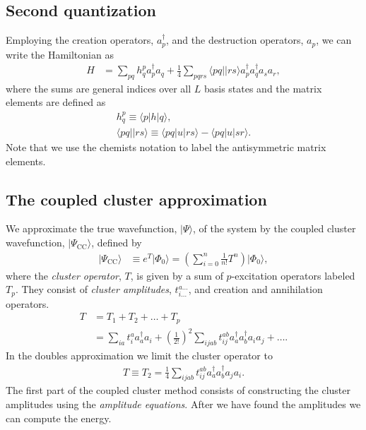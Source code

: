 \documentclass[
    a4paper, aps, twocolumn, floatfix, superscriptaddress,
    nofootinbib]{revtex4-1}
\newcommand{\1}{\mathds{1}}
\newcommand{\para}[1]{\left(#1\right)}
\newcommand{\bra}[1]{\langle #1\lvert}
\newcommand{\ket}[1]{\rvert #1\rangle}
\newcommand{\acr}[1]{a_{#1}^{\dagger}}
\newcommand{\ade}[1]{a_{#1}}
\begin{document}
    \subsection{Second quantization}
        Employing the creation operators, $\acr{p}$, and the destruction
        operators, $\ade{p}$, we can write the Hamiltonian as
        \begin{align}
            H
            &=
            \sum_{pq}h_{q}^{p}\acr{p}\ade{q}
            + \frac{1}{4}\sum_{pqrs}\bra{pq}\ket{rs}\acr{p}\acr{q}\ade{s}\ade{r},
        \end{align}
        where the sums are general indices over all $L$ basis states and the
        matrix elements are defined as
        \begin{gather}
            h^{p}_{q} \equiv \bra{p}h\ket{q}, \\
            \bra{pq}\ket{rs} \equiv \bra{pq}u\ket{rs} - \bra{pq}u\ket{sr}.
        \end{gather}
        Note that we use the chemists notation to label the antisymmetric matrix
        elements.

    \subsection{The coupled cluster approximation}
        We approximate the true wavefunction, $\ket{\Psi}$, of the system by the
        coupled cluster wavefunction, $\ket{\Psi_{\text{CC}}}$, defined by
        \begin{align}
            \ket{\Psi_{\text{CC}}}
            &\equiv e^{T}\ket{\Phi_0}
            = \para{
                \sum_{i = 0}^n
                \frac{1}{n!}T^n
            }\ket{\Phi_0},
        \end{align}
        where the \emph{cluster operator}, $T$, is given by a sum of
        $p$-excitation operators labeled $T_p$. They consist of \emph{cluster
        amplitudes}, $t_{i\dots}^{a\dots}$, and creation and annihilation
        operators.
        \begin{align}
            T &= T_1 + T_2 + \dots + T_p \\
            &=
            \sum_{ia}t_i^a\acr{a}\ade{i}
            + \para{\frac{1}{2!}}^2\sum_{ijab}
            t_{ij}^{ab}\acr{a}\acr{b}\ade{i}\ade{j}
            + \dots.
        \end{align}
        In the doubles approximation we limit the cluster operator to
        \begin{align}
            T \equiv T_2
            = \frac{1}{4}\sum_{ijab}t_{ij}^{ab}\acr{a}\acr{b}\ade{j}\ade{i}.
            \label{eq:T_2}
        \end{align}
        The first part of the coupled cluster method consists of constructing
        the cluster amplitudes using the \emph{amplitude equations}. After we
        have found the amplitudes we can compute the energy.
\end{document}

